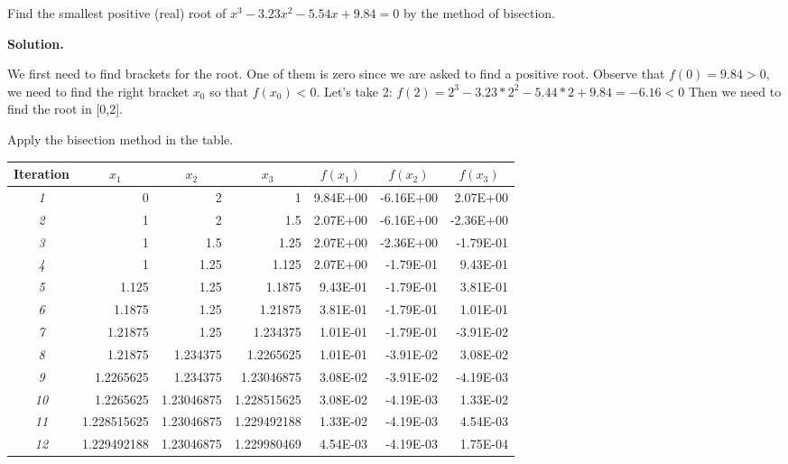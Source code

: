 \begin{exercise}{2} %
Find the smallest positive (real) root of $x^3-3.23x^2-5.54x+9.84 = 0$ by the
method of bisection.

\textbf{Solution.}

We first need to find brackets for the root. One of them is zero since we are asked to find a positive root. Observe that \(f(0) = 9.84 > 0\), we need to find the right bracket $x_0$ so that \(f(x_0) < 0\). Let's take 2: $f(2) = 2^3 - 3.23*2^2 - 5.44*2 + 9.84 = - 6.16 < 0$
Then we need to find the root in [0,2].

Apply the bisection method in the table.
\begin{table}[h]
\begin{tabular}{|c|r|r|r|r|r|r|}
\hline
\textbf{Iteration} & \multicolumn{1}{c|}{\textbf{\(x_1\)}} & \multicolumn{1}{c|}{\textbf{\(x_2\)}} & \multicolumn{1}{c|}{\textbf{\(x_3\)}} & \multicolumn{1}{c|}{\textbf{\(f(x_1)\)}} & \multicolumn{1}{c|}{\textbf{\(f(x_2)\)}} & \multicolumn{1}{c|}{\textbf{\(f(x_3)\)}} \\ \hline
\textit{1} & 0 & 2 & 1 & 9.84E+00 & -6.16E+00 & 2.07E+00 \\ \hline
\textit{2} & 1 & 2 & 1.5 & 2.07E+00 & -6.16E+00 & -2.36E+00 \\ \hline
\textit{3} & 1 & 1.5 & 1.25 & 2.07E+00 & -2.36E+00 & -1.79E-01 \\ \hline
\textit{4} & 1 & 1.25 & 1.125 & 2.07E+00 & -1.79E-01 & 9.43E-01 \\ \hline
\textit{5} & 1.125 & 1.25 & 1.1875 & 9.43E-01 & -1.79E-01 & 3.81E-01 \\ \hline
\textit{6} & 1.1875 & 1.25 & 1.21875 & 3.81E-01 & -1.79E-01 & 1.01E-01 \\ \hline
\textit{7} & 1.21875 & 1.25 & 1.234375 & 1.01E-01 & -1.79E-01 & -3.91E-02 \\ \hline
\textit{8} & 1.21875 & 1.234375 & 1.2265625 & 1.01E-01 & -3.91E-02 & 3.08E-02 \\ \hline
\textit{9} & 1.2265625 & 1.234375 & 1.23046875 & 3.08E-02 & -3.91E-02 & -4.19E-03 \\ \hline
\textit{10} & 1.2265625 & 1.23046875 & 1.228515625 & 3.08E-02 & -4.19E-03 & 1.33E-02 \\ \hline
\textit{11} & 1.228515625 & 1.23046875 & 1.229492188 & 1.33E-02 & -4.19E-03 & 4.54E-03 \\ \hline
\textit{12} & 1.229492188 & 1.23046875 & 1.229980469 & 4.54E-03 & -4.19E-03 & 1.75E-04 \\ \hline

\end{tabular}
\end{table}
\end{exercise}
